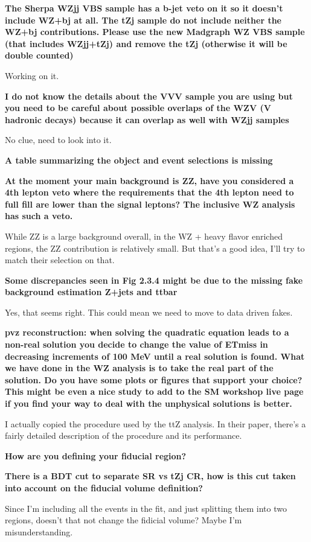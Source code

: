 \documentclass[NOTE, atlasdraft=true, texlive=2016, UKenglish]{\ATLASLATEXPATH atlasdoc}
\begin{document}
\textbf{The Sherpa WZjj VBS sample has a b-jet veto on it so it doesn’t include WZ+bj at all. The tZj sample do not include neither the WZ+bj contributions. Please use the new Madgraph WZ VBS sample (that includes WZjj+tZj) and remove the tZj (otherwise it will be double counted)}

Working on it.

\textbf{I do not know the details about the VVV sample you are using but you need to be careful about possible overlaps of the WZV (V hadronic decays) because it can overlap as well with WZjj samples}

No clue, need to look into it. 

\textbf{A table summarizing the object and event selections is missing}

\textbf{At the moment your main background is ZZ, have you considered a 4th lepton veto where the requirements that the 4th lepton need to full fill are lower than the signal leptons? The inclusive WZ analysis has such a veto.}

While ZZ is a large background overall, in the WZ + heavy flavor enriched regions, the ZZ contribution is relatively small. But that's a good idea, I'll try to match their selection on that.

\textbf{Some discrepancies seen in Fig 2.3.4 might be due to the missing fake background estimation Z+jets and ttbar }

Yes, that seems right. This could mean we need to move to data driven fakes.

\textbf{pvz reconstruction: when solving the quadratic equation leads to a non-real solution you decide to change the value of ETmiss in decreasing increments of 100 MeV until a real solution is found. What we have done in the WZ analysis is to take the real part of the solution. Do you have some plots or figures that support your choice? This might be even a nice study to add to the SM workshop live page if you find your way to deal with the unphysical solutions is better.}

I actually copied the procedure used by the ttZ analysis. In their paper, there's a fairly detailed description of the procedure and its performance.

\textbf{How are you defining your fiducial region? }

\textbf{There is a BDT cut to separate SR vs tZj CR, how is this cut taken into account on the fiducial volume definition?}

Since I'm including all the events in the fit, and just splitting them into two regions, doesn't that not change the fidicial volume? Maybe I'm misunderstanding.
\end{document}

